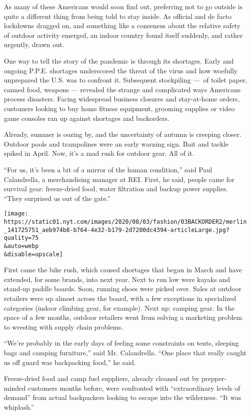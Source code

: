 As many of these Americans would soon find out, preferring not to go
outside is quite a different thing from being told to stay inside. As
official and de facto lockdowns dragged on, and something like a
consensus about the relative safety of outdoor activity emerged, an
indoor country found itself suddenly, and rather urgently, drawn out.

One way to tell the story of the pandemic is through its shortages.
Early and ongoing P.P.E. shortages underscored the threat of the virus
and how woefully unprepared the U.S. was to confront it. Subsequent
stockpiling ---~of toilet paper, canned food, weapons --- revealed the
strange and complicated ways Americans process disasters. Facing
widespread business closures and stay-at-home orders, customers looking
to buy home fitness equipment, grooming supplies or video game consoles
ran up against shortages and backorders.

Already, summer is oozing by, and the uncertainty of autumn is creeping
closer. Outdoor pools and trampolines were an early warning sign. Bait
and tackle spiked in April. Now, it's a mad rush for outdoor gear. All
of it.

``For us, it's been a bit of a mirror of the human condition,'' said
Paul Calandrella, a merchandising manager at REI. First, he said, people
came for survival gear: freeze-dried food, water filtration and backup
power supplies. ``They surprised us out of the gate.''

\texttt{[image: https://static01.nyt.com/images/2020/08/03/fashion/03BACKORDER2/merlin\_141725751\_aeb974b8-b764-4e32-b179-2d7200dc4394-articleLarge.jpg?quality=75\\\&auto=webp\\\&disable=upscale]}

First came the bike rush, which caused shortages that began in March and
have extended, for some brands, into next year. Next to run low were
kayaks and stand-up paddle boards. Soon, running shoes were picked over.
Sales at outdoor retailers were up almost across the board, with a few
exceptions in specialized categories (indoor climbing gear, for
example). Next up: camping gear. In the space of a few months, outdoor
retailers went from solving a marketing problem to wresting with supply
chain problems.

``We're probably in the early days of feeling some constraints on tents,
sleeping bags and camping furniture,'' said Mr. Calandrella. ``One place
that really caught us off guard was backpacking food,'' he said.

Freeze-dried food and camp fuel suppliers, already cleaned out by
prepper-minded customers months before, were confronted with
``extraordinary levels of demand'' from actual backpackers looking to
escape into the wilderness. ``It was whiplash.''

